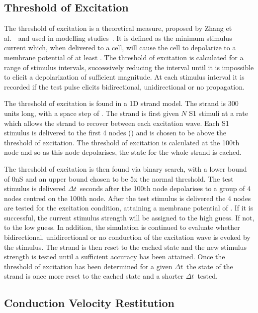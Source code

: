 \subsection{Threshold of Excitation}

The threshold of excitation is a theoretical measure, proposed by Zhang et
al.~\cite{Zhang2003}\ and used in modelling studies~\cite{Kharche2008}.  It is
defined as the minimum stimulus current which, when delivered to a cell, will
cause the cell to depolarize to a membrane potential of at least .  The
threshold of excitation is calculated for a range of stimulus intervals,
successively reducing the interval until it is impossible to elicit a
depolarization of sufficient magnitude.  At each stimulus interval it is
recorded if the test pulse elicits bidirectional, unidirectional or no
propagation.

The threshold of excitation is found in a 1D strand model.  The strand is 300
units long, with a space step of .  The strand is first given $N$ S1
stimuli at a rate which allows the strand to recover between each excitation
wave.  Each S1 stimulus is delivered to the first 4 nodes () and is
chosen to be above the threshold of excitation.  The threshold of excitation is
calculated at the 100th node and so as this node depolarises, the state for the
whole strand is cached.

The threshold of excitation is then found via binary search, with a lower bound
of \unit{0}{nS} and an upper bound chosen to be 5x the normal threshold.  The
test stimulus is delivered $\Delta t$\ seconds after the 100th node depolarises
to a group of 4 nodes centred on the 100th node.  After the test stimulus is
delivered the 4 nodes are tested for the excitation condition, attaining a
membrane potential of .  If it is successful, the current stimulus
strength will be assigned to the high guess.  If not, to the low guess.  In
addition, the simulation is continued to evaluate whether bidirectional,
unidirectional or no conduction of the excitation wave is evoked by the
stimulus.  The strand is then reset to the cached state and the new stimulus
strength is tested until a sufficient accuracy has been attained.  Once the
threshold of excitation has been determined for a given $\Delta t$\ the state of
the strand is once more reset to the cached state and a shorter $\Delta t$\
tested.

\subsection{Conduction Velocity Restitution}

